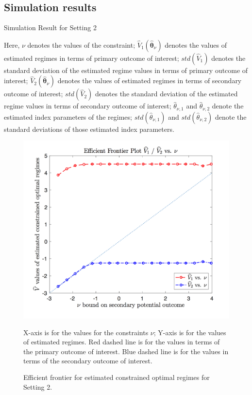 \documentclass{article}
\newcommand{\wh}{\widehat}
\newcommand{\bs}{ \boldsymbol}
\begin{document}
\begin{appendices}
	\subsection{Simulation results}

\begin{table}[!htbp]
	\caption {Simulation Result for Setting 2}
	\centering
	{\tt
		
	}
	\justify
	Here, $\nu$ denotes the values of the constraint; $\wh{V}_1(\wh{\bs{\theta}}_{\nu})$ denotes the values of estimated regimes in terms of primary outcome of interest; $std(\wh{V}_1)$ denotes the standard deviation of the estimated regime values in terms of primary outcome of interest; $\wh{V}_2(\wh{\bs{\theta}}_{\nu})$ denotes the values of estimated regimes in terms of secondary outcome of interest; $std(\wh{V}_2)$ denotes the standard deviation of the estimated regime values in terms of secondary outcome of interest; $\wh{\theta}_{\nu,1}$ and $\wh{\theta}_{\nu,2}$ denote the estimated index parameters of the regimes; $std(\wh{\theta}_{\nu,1})$ and $std(\wh{\theta}_{\nu,2})$ denote the standard deviations of those estimated index parameters.	
\end{table} 
\begin{figure}[!htb]
	\centering
	\includegraphics[width=.9\linewidth]{./figs/efficient_plot2.png}
	\caption{Efficient frontier for estimated constrained optimal regimes for Setting 2.}
	\label{fig:2}
	\justify
X-axis is for the values for the constraints $\nu$; Y-axis is for the values of estimated regimes. Red dashed line is for the values in terms of the primary outcome of interest. Blue dashed line is for the values in terms of the secondary outcome of interest.

\end{figure}
\end{appendices}
\end{document}
